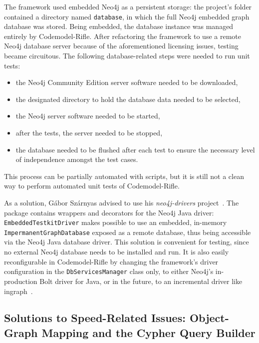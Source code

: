 The framework used embedded Neo4j as a persistent storage: the project's folder contained a directory named \lstinline{database}, in which the full Neo4j embedded graph database was stored. Being embedded, the database instance was managed entirely by Codemodel-Rifle. After refactoring the framework to use a remote Neo4j database server because of the aforementioned licensing issues, testing became circuitous. The following database-related steps were needed to run unit tests:

\begin{itemize}
\item the Neo4j Community Edition server software needed to be downloaded,
\item the designated directory to hold the database data needed to be selected,
\item the Neo4j server software needed to be started,
\item after the tests, the server needed to be stopped,
\item the database needed to be flushed after each test to ensure the necessary level of independence amongst the test cases.
\end{itemize}

This process can be partially automated with scripts, but it is still not a clean way to perform automated unit tests of Codemodel-Rifle.

As a solution, Gábor Szárnyas advised to use his \emph{neo4j-drivers} project~\cite{neo4j-drivers}. The package contains wrappers and decorators for the Neo4j Java driver: \lstinline{EmbeddedTestkitDriver} makes possible to use an embedded, in-memory \lstinline{ImpermanentGraphDatabase} exposed as a remote database, thus being accessible via the Neo4j Java database driver. This solution is convenient for testing, since no external Neo4j database needs to be installed and run. It is also easily reconfigurable in Codemodel-Rifle by changing the framework's driver configuration in the \lstinline{DbServicesManager} class only, to either Neo4j's in-production Bolt driver for Java, or in the future, to an incremental driver like ingraph~\cite{ingraph-github}.


\subsection{Solutions to Speed-Related Issues: Object-Graph Mapping and the Cypher Query Builder}

